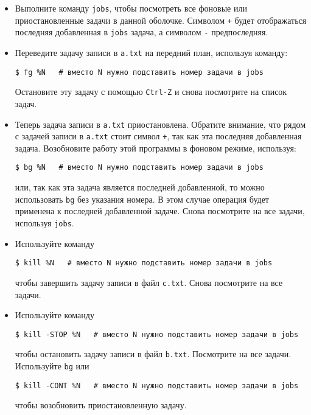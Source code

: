 \documentclass{article}
\begin{document}
\begin{enumerate}[(a)]
\begin{itemize}[leftmargin=1mm,label={--}]
\item Выполните команду \texttt{jobs}, чтобы посмотреть все фоновые или приостановленные задачи в данной оболочке. Символом \texttt{+} будет отображаться последняя добавленная в \texttt{jobs} задача, а символом \texttt{-} предпоследняя.

\item Переведите задачу записи в \texttt{a.txt} на передний план, используя команду:
\begin{lstlisting}
$ fg %N   # вместо N нужно подставить номер задачи в jobs
\end{lstlisting}
Остановите эту задачу с помощью \texttt{Ctrl-Z} и снова посмотрите на список задач.


\item Теперь задача записи в \texttt{a.txt} приостановлена. Обратите внимание, что рядом с задачей записи в \texttt{a.txt} стоит символ \texttt{+}, так как эта последняя добавленная задача. Возобновите работу этой программы в фоновом режиме, используя:
\begin{lstlisting}
$ bg %N   # вместо N нужно подставить номер задачи в jobs
\end{lstlisting}
или, так как эта задача является последней добавленной, то можно использовать \texttt{bg} без указания номера. В этом случае операция будет применена к последней добавленной задаче. Снова посмотрите на все задачи, используя \texttt{jobs}.

\item Используйте команду
\begin{lstlisting}
$ kill %N   # вместо N нужно подставить номер задачи в jobs
\end{lstlisting}
чтобы завершить задачу записи в файл \texttt{c.txt}. Снова посмотрите на все задачи.

\item Используйте команду
\begin{lstlisting}
$ kill -STOP %N   # вместо N нужно подставить номер задачи в jobs
\end{lstlisting}
чтобы остановить задачу записи в файл \texttt{b.txt}. Посмотрите на все задачи. Используйте \texttt{bg} или 
\begin{lstlisting}
$ kill -CONT %N   # вместо N нужно подставить номер задачи в jobs
\end{lstlisting}
чтобы возобновить приостановленную задачу.
\end{itemize}


\end{enumerate}
\end{document}

